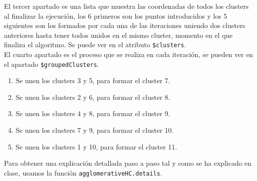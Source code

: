 \documentclass[12pt]{report}\usepackage[]{graphicx}\usepackage[dvipsnames]{xcolor}
\begin{document}
	El tercer apartado es una lista que muestra las coordenadas de todos los clusters al finalizar la ejecución, los 6 primeros son los puntos introducidos y los 5 siguientes son los formados por cada una de las iteraciones uniendo dos clusters anteriores hasta tener todos unidos en el mismo cluster, momento en el que finaliza el algoritmo. Se puede ver en el atributo \texttt{\$clusters}.\\
	
	El cuarto apartado es el proceso que se realiza en cada iteración, se pueden ver en el apartado \texttt{\$groupedClusters}.
	
	\begin{enumerate}
		\item Se unen los clusters 3 y 5, para formar el cluster 7.
		\item Se unen los clusters 2 y 6, para formar el cluster 8.
		\item Se unen los clusters 4 y 8, para formar el cluster 9.
		\item Se unen los clusters 7 y 9, para formar el cluster 10.
		\item Se unen los clusters 1 y 10, para formar el cluster 11.
	\end{enumerate}
	
	Para obtener una explicación detallada paso a paso tal y como se ha explicado en clase, usamos la función \texttt{agglomerativeHC.details}.
	
\end{document}

